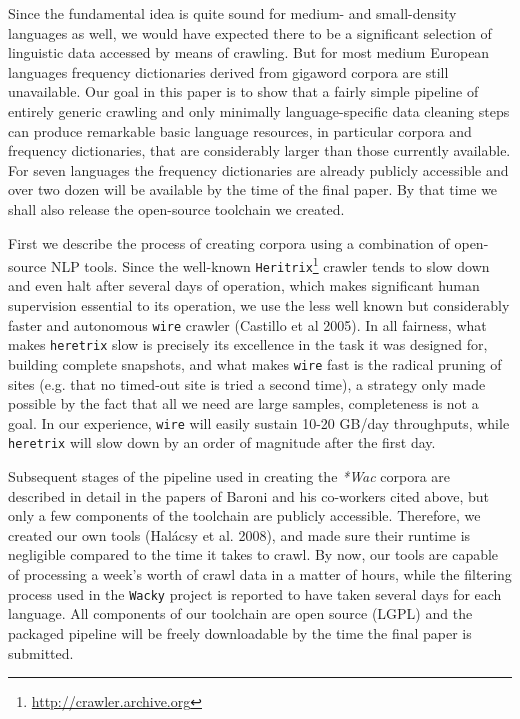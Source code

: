 \documentclass[10pt, a4paper]{article}
\begin{document}
Since the fundamental idea is quite sound for medium- and small-density
languages as well, we would have expected there to be a significant selection
of linguistic data accessed by means of crawling. But for most medium European
languages frequency dictionaries derived from gigaword corpora are still
unavailable. Our goal in this paper is to show that a fairly simple pipeline
of entirely generic crawling and only minimally language-specific data
cleaning steps can produce remarkable basic language resources, in particular
corpora and frequency dictionaries, that are considerably larger than those
currently available.
For seven languages the frequency dictionaries are already publicly accessible
and over two dozen will be available by the time of the final paper. By that
time we shall also release the open-source toolchain we created.

First we describe the process of creating corpora using a combination of
open-source NLP tools. Since the well-known
\texttt{Heritrix}\footnote{\href{http://crawler.archive.org}{http://crawler.archive.org}}
crawler tends to slow down and even halt after several days of operation,
which makes significant human supervision essential to its operation, we use
the less well known but considerably faster and autonomous {\tt wire} crawler
(Castillo et al 2005).\nocite{castillo2005wire} In all fairness, what makes
{\tt heretrix} slow is precisely its excellence in the task it was designed
for, building complete snapshots, and what makes {\tt wire} fast is the
radical pruning of sites (e.g. that no timed-out site is tried a second time),
a strategy only made possible by the fact that all we need are large samples,
completeness is not a goal. In our experience, {\tt wire} will easily sustain
10-20 GB/day throughputs, while {\tt heretrix} will slow down by an order of
magnitude after the first day.

Subsequent stages of the pipeline used in creating the \textit{*Wac} corpora
are described in detail in the papers of Baroni and his co-workers cited
above, but only a few components of the toolchain are publicly
accessible. Therefore, we created our own tools (Hal\'acsy et
al. 2008)\nocite{halacsy2008parallel}, and made sure their runtime is
negligible compared to the time it takes to crawl. By now, our tools are
capable of processing a week's worth of crawl data in a matter of hours, while
the filtering process used in the \texttt{Wacky} project is reported to have
taken several days for each language.  All components of our toolchain are
open source (LGPL) and the packaged pipeline will be freely downloadable by
the time the final paper is submitted.
\end{document}
